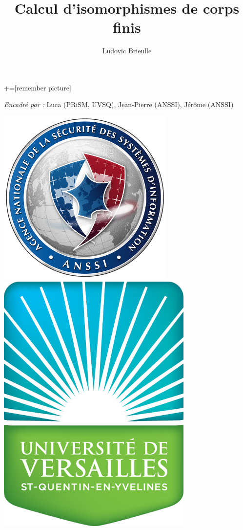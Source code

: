 \documentclass{beamer} %
\numberwithin{equation}{section}
\begin{document}
\title{Calcul d'isomorphismes de corps finis}
\author{Ludovic Brieulle}
\newtheorem*{thm}{Thèorème}
\newtheorem{lem}{Lemme}
\newtheorem{cor}{Corollaire}
\newtheorem{prop}{Proposition}
\theoremstyle{definition}
\newtheorem{defn}{Définition}
\newtheorem*{ex}{Exemple}
\theoremstyle{remark}
\newtheorem*{rem}{Remarque}
\newtheorem*{conj}{Conjecture}
+=[remember picture]
\everymath{\displaystyle}





\begin{frame}
\begin{titlepage}
\emph{Encadré par :}
Luca  (PRiSM, UVSQ), %
Jean-Pierre  (ANSSI), %
Jérôme  (ANSSI)%
\begin{center}
\includegraphics[scale=0.3]{Anssi}
\hspace{3cm}
\includegraphics[scale=0.2]{UVSQ}
\end{center}
\end{titlepage}
\end{frame}
\end{document}
